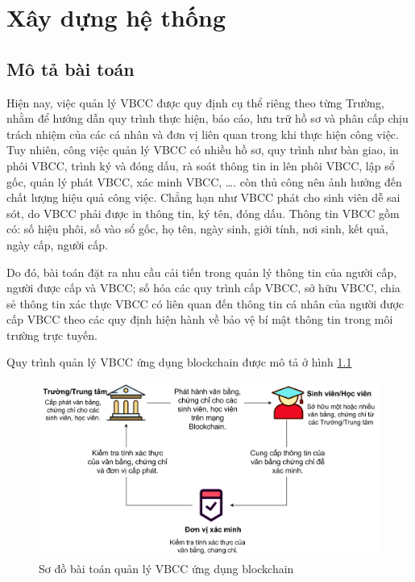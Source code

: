 \chapter{Xây dựng hệ thống}

\section{Mô tả bài toán}

Hiện nay, việc quản lý VBCC được quy định cụ thể riêng theo từng Trường, nhằm để hướng dẫn quy trình thực hiện, báo cáo, lưu trữ hồ sơ và phân cấp chịu trách nhiệm của các cá nhân và đơn vị liên quan trong khi thực hiện công việc.
Tuy nhiên, công việc quản lý VBCC có nhiều hồ sơ, quy trình như bàn giao, in phôi VBCC, trình ký và đóng dấu, rà soát thông tin in lên phôi VBCC, lập sổ gốc, quản lý phát VBCC, xác minh VBCC, \ldots. còn thủ công nên ảnh hưởng đến chất lượng hiệu quả công việc.
Chẳng hạn như VBCC phát cho sinh viên dễ sai sót, do VBCC phải được in thông tin, ký tên, đóng dấu. Thông tin VBCC gồm có: số hiệu phôi, số vào sổ gốc, họ tên, ngày sinh, giới tính, nơi sinh, kết quả, ngày cấp, người cấp. 

Do đó, bài toán đặt ra nhu cầu cải tiến trong quản lý thông tin của người cấp, người được cấp và VBCC; số hóa các quy trình cấp VBCC, sở hữu VBCC, chia sẻ thông tin xác thực VBCC có liên quan đến thông tin cá nhân của người được cấp VBCC theo các quy định hiện hành về bảo vệ bí mật thông tin trong môi trường trực tuyến.

Quy trình quản lý VBCC ứng dụng blockchain được mô tả ở hình \ref{fig:vbcc}

\begin{figure}[htbp]
\centering
\includegraphics[width=.9\linewidth]{img/vbcc.jpg}
\caption{Sơ đồ bài toán quản lý VBCC ứng dụng blockchain}
\label{fig:vbcc}
\end{figure}

